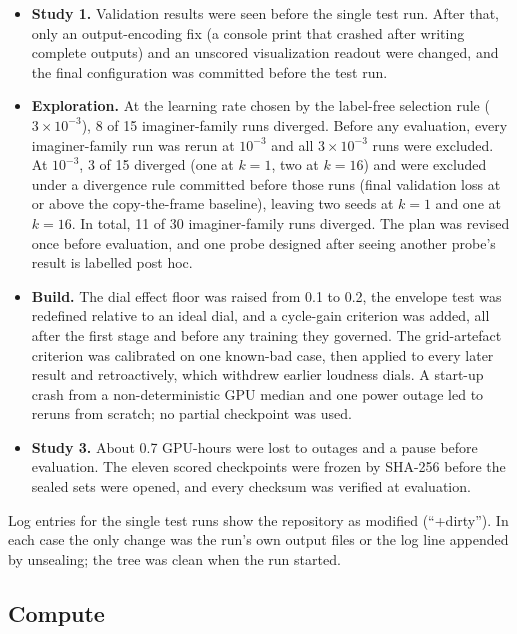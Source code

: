 \documentclass[10pt]{article}
\begin{document}
\begin{itemize}
\item \textbf{Study 1.} Validation results were seen before the single test run. After that, only an output-encoding fix (a console print that crashed after writing complete outputs) and an unscored visualization readout were changed, and the final configuration was committed before the test run.
\item \textbf{Exploration.} At the learning rate chosen by the label-free selection rule ($3\times10^{-3}$), 8 of 15 imaginer-family runs diverged. Before any evaluation, every imaginer-family run was rerun at $10^{-3}$ and all $3\times10^{-3}$ runs were excluded. At $10^{-3}$, 3 of 15 diverged (one at $k = 1$, two at $k = 16$) and were excluded under a divergence rule committed before those runs (final validation loss at or above the copy-the-frame baseline), leaving two seeds at $k = 1$ and one at $k = 16.$ In total, 11 of 30 imaginer-family runs diverged. The plan was revised once before evaluation, and one probe designed after seeing another probe's result is labelled post hoc.
\item \textbf{Build.} The dial effect floor was raised from 0.1 to 0.2, the envelope test was redefined relative to an ideal dial, and a cycle-gain criterion was added, all after the first stage and before any training they governed. The grid-artefact criterion was calibrated on one known-bad case, then applied to every later result and retroactively, which withdrew earlier loudness dials. A start-up crash from a non-deterministic GPU median and one power outage led to reruns from scratch; no partial checkpoint was used.
\item \textbf{Study 3.} About 0.7 GPU-hours were lost to outages and a pause before evaluation. The eleven scored checkpoints were frozen by SHA-256 before the sealed sets were opened, and every checksum was verified at evaluation.
\end{itemize}

Log entries for the single test runs show the repository as modified (``+dirty''). In each case the only change was the run's own output files or the log line appended by unsealing; the tree was clean when the run started.

\subsection{Compute}\label{sec:8.3}
\end{document}
